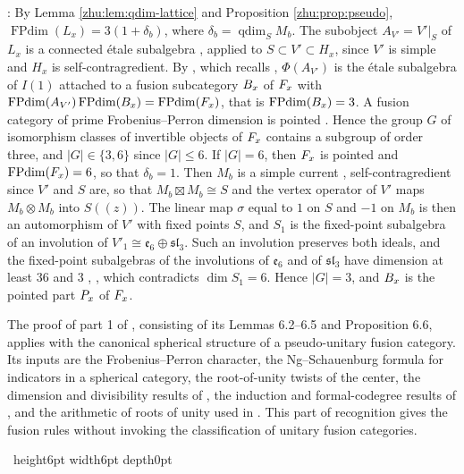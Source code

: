 \documentclass[leqno]{article}
\let\cal\relax
\newcommand{\cal}{\mathcal}
\renewcommand{\leq}{\ensuremath{\leqslant}}
\newcommand{\qed}{\hfill \vrule height6pt  width6pt depth0pt}
\newcommand{\ot}{\otimes}
\newenvironment{proof}[1][]{\noindent {\it Proof #1} : }{\hbox{~}\qed
\smallskip
}
\numberwithin{equation}{section}
\begin{document}
\begin{proof}
By Lemma \ref{zhu:lem:qdim-lattice} and Proposition \ref{zhu:prop:pseudo}, $\operatorname{FPdim}(L_x) = 3(1 + \delta_b)$, where $\delta_b = \operatorname{qdim}_S M_b$. The subobject $A_{V'} = V'|_S$ of $L_x$ is a connected étale subalgebra \cite[Lemma 2.3]{ArhII}, applied to $S \subset V' \subset H_x$, since $V'$ is simple and $H_x$ is self-contragredient. By \cite[Proposition 2.2, part 3]{ArhII}, which recalls \cite[Theorem 4.10 p.~18]{DMNO13}, $\Phi(A_{V'})$ is the étale subalgebra of $I(1)$ attached to a fusion subcategory $\cal B_x$ of $\cal F_x$ with $\operatorname{FPdim}(A_{V'})\operatorname{FPdim}(\cal B_x) = \operatorname{FPdim}(\cal F_x)$, that is $\operatorname{FPdim}(\cal B_x) = 3$. A fusion category of prime Frobenius--Perron dimension is pointed \cite[Corollary 8.30 p.~37]{ENO05}. Hence the group $G$ of isomorphism classes of invertible objects of $\cal F_x$ contains a subgroup of order three, and $|G| \in \{3,6\}$ since $|G| \leq 6$. If $|G| = 6$, then $\cal F_x$ is pointed and $\operatorname{FPdim}(\cal F_x) = 6$, so that $\delta_b = 1$. Then $M_b$ is a simple current \cite[Proposition 4.17 p.~6456]{DJX13}, self-contragredient since $V'$ and $S$ are, so that $M_b \boxtimes M_b \cong S$ and the vertex operator of $V'$ maps $M_b \ot M_b$ into $S((z))$. The linear map $\sigma$ equal to $1$ on $S$ and $-1$ on $M_b$ is then an automorphism of $V'$ with fixed points $S$, and $S_1$ is the fixed-point subalgebra of an involution of $V'_1 \cong \mathfrak e_6 \oplus \mathfrak{sl}_3$. Such an involution preserves both ideals, and the fixed-point subalgebras of the involutions of $\mathfrak e_6$ and of $\mathfrak{sl}_3$ have dimension at least $36$ and $3$ \cite[Chapter 8]{Kac90}, \cite[Chapter X]{Hel78}, which contradicts $\dim S_1 = 6$. Hence $|G| = 3$, and $\cal B_x$ is the pointed part $\cal P_x$ of $\cal F_x$.

The proof of part 1 of \cite[Theorem 6.1]{ArhII}, consisting of its Lemmas 6.2--6.5 and Proposition 6.6, applies with the canonical spherical structure of a pseudo-unitary fusion category. Its inputs are the Frobenius--Perron character, the Ng--Schauenburg formula for indicators in a spherical category, the root-of-unity twists of the center, the dimension and divisibility results of \cite[Propositions 5.4 and 8.12]{ENO05}, the induction and formal-codegree results of \cite[Theorems 2.5 and 2.13]{Ost15}, and the arithmetic of roots of unity used in \cite[Section 6.3]{ArhII}. This part of recognition gives the fusion rules without invoking the classification of unitary fusion categories.


\end{proof}
\end{document}
